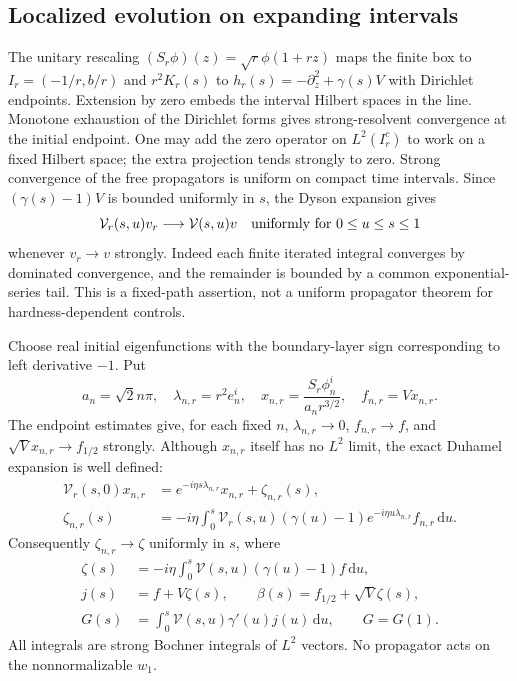 \documentclass[aps,prl,reprint,superscriptaddress,longbibliography]{revtex4-2}
\newcommand{\dd}{\mathrm{d}}
\begin{document}
\subsection{Localized evolution on expanding intervals}

The unitary rescaling $(S_r\phi)(z)=\sqrt r\phi(1+rz)$ maps the finite box to $I_r=(-1/r,b/r)$ and $r^2K_r(s)$ to $h_r(s)=-\partial_z^2+\gamma(s)V$ with Dirichlet endpoints. Extension by zero embeds the interval Hilbert spaces in the line. Monotone exhaustion of the Dirichlet forms gives strong-resolvent convergence at the initial endpoint. One may add the zero operator on $L^2(I_r^c)$ to work on a fixed Hilbert space; the extra projection tends strongly to zero. Strong convergence of the free propagators is uniform on compact time intervals. Since $(\gamma(s)-1)V$ is bounded uniformly in $s$, the Dyson expansion gives
\begin{equation}
 \mathcal V_r(s,u)v_r\longrightarrow\mathcal V(s,u)v
 \quad\hbox{uniformly for }0\le u\le s\le1
 \label{th:prop}
\end{equation}
whenever $v_r\to v$ strongly. Indeed each finite iterated integral converges by dominated convergence, and the remainder is bounded by a common exponential-series tail. This is a fixed-path assertion, not a uniform propagator theorem for hardness-dependent controls.

Choose real initial eigenfunctions with the boundary-layer sign corresponding to left derivative $-1$. Put
\begin{equation}
 a_n=\sqrt2n\pi,\quad \lambda_{n,r}=r^2e_n^i,\quad
 x_{n,r}=\frac{S_r\phi_n^i}{a_nr^{3/2}},\quad f_{n,r}=Vx_{n,r}.
 \label{th:x}
\end{equation}
The endpoint estimates give, for each fixed $n$, $\lambda_{n,r}\to0$, $f_{n,r}\to f$, and $\sqrt Vx_{n,r}\to f_{1/2}$ strongly. Although $x_{n,r}$ itself has no $L^2$ limit, the exact Duhamel expansion is well defined:
\begin{align}
 \mathcal V_r(s,0)x_{n,r}
 &=e^{-i\eta s\lambda_{n,r}}x_{n,r}+\zeta_{n,r}(s),\nonumber\\
 \zeta_{n,r}(s)
 &=-i\eta\int_0^s\mathcal V_r(s,u)(\gamma(u)-1)
 e^{-i\eta u\lambda_{n,r}}f_{n,r}\,\dd u.
 \label{th:duhamel}
\end{align}
Consequently $\zeta_{n,r}\to\zeta$ uniformly in $s$, where
\begin{align}
 \zeta(s)&=-i\eta\int_0^s\mathcal V(s,u)(\gamma(u)-1)f\,\dd u,\nonumber\\
 j(s)&=f+V\zeta(s),\qquad
 \beta(s)=f_{1/2}+\sqrt V\zeta(s),\nonumber\\
 G(s)&=\int_0^s\mathcal V(s,u)\gamma'(u)j(u)\,\dd u,
 \qquad G=G(1).
 \label{th:limsource}
\end{align}
All integrals are strong Bochner integrals of $L^2$ vectors. No propagator acts on the nonnormalizable $w_1$.
\end{document}
